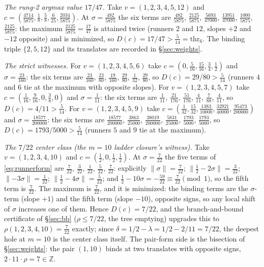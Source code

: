 \documentclass[11pt,a4paper]{article}
\numberwithin{equation}{section}
\theoremstyle{plain}
\theoremstyle{definition}
\theoremstyle{remark}
\newcommand{\Z}{\mathbb{Z}}
\newcommand{\wnc}[1]{\lVert #1 \rVert}
\begin{document}
\emph{The rung-2 argmax value $17/47$.} Take
$v=(1,2,3,4,5,12)$ and
$c=(\tfrac{4714}{5875},\tfrac18,\tfrac58,\tfrac6{25},
\tfrac{2034}{5875})$. At $\sigma=\tfrac{482}{5875}$ the six terms are
$\tfrac{482}{5875}$, $\tfrac{2125}{5875}$, $\tfrac{5693}{47000}$,
$\tfrac{13951}{47000}$, $\tfrac{1000}{5875}$, $\tfrac{2125}{5875}$:
the maximum $\tfrac{2125}{5875}=\tfrac{17}{47}$ is attained twice
(runners $2$ and $12$, slopes $+2$ and $-12$ opposite) and is
minimized, so $D(c)=17/47>\tfrac5{14}=\mathrm{thr}_6$. The binding
triple $\{2,5,12\}$ and its translates are recorded in
\S\ref{sec:weights}.

\emph{The strict witnesses.} For $v=(1,2,3,4,5,6)$ take
$c=(0,\tfrac5{16},\tfrac{15}{16},\tfrac34,\tfrac12)$ and
$\sigma=\tfrac{23}{160}$: the six terms are
$\tfrac{23}{160}$, $\tfrac{23}{80}$, $\tfrac{19}{160}$, $\tfrac{29}{80}$,
$\tfrac1{32}$, $\tfrac{29}{80}$, so $D(c)=29/80>\tfrac5{14}$ (runners
$4$ and $6$ tie at the maximum with opposite slopes). For
$v=(1,2,3,4,5,7)$ take
$c=(\tfrac1{16},\tfrac9{16},0,\tfrac38,0)$ and $\sigma=\tfrac1{11}$:
the six terms are $\tfrac1{11}$, $\tfrac{21}{176}$, $\tfrac{51}{176}$,
$\tfrac4{11}$, $\tfrac7{88}$, $\tfrac4{11}$, so $D(c)=4/11>
\tfrac5{14}$. For $v=(1,2,3,4,5,9)$ take
$c=(\tfrac1{32},\tfrac{15}{32},\tfrac{1383}{10000},
\tfrac{32921}{40000},\tfrac{95473}{200000})$ and
$\sigma=\tfrac{18577}{200000}$: the six terms are
$\tfrac{18577}{200000}$, $\tfrac{3863}{25000}$,
$\tfrac{38019}{200000}$, $\tfrac{5831}{25000}$, $\tfrac{1793}{5000}$,
$\tfrac{1793}{5000}$, so $D(c)=1793/5000>\tfrac5{14}$ (runners $5$ and
$9$ tie at the maximum).

\emph{The $7/22$ center class (the $m=10$ ladder closure's witness).}
Take $v=(1,2,3,4,10)$ and
$c=(\tfrac12,0,\tfrac12,\tfrac12)$. At $\sigma=\tfrac{7}{22}$ the five
terms of \eqref{eq:runnerform} are $\tfrac{7}{22}$, $\tfrac{3}{22}$,
$\tfrac{1}{22}$, $\tfrac{5}{22}$, $\tfrac{7}{22}$: explicitly
$\wnc\sigma=\tfrac7{22}$; $\wnc{\tfrac12-2\sigma}=\tfrac3{22}$;
$\wnc{-3\sigma}=\tfrac1{22}$;
$\wnc{\tfrac12-4\sigma}=\tfrac5{22}$; and
$\tfrac12-10\sigma=-\tfrac{59}{22}\equiv\tfrac7{22}\pmod 1$, so the
fifth term is $\tfrac7{22}$. The maximum is $\tfrac7{22}$, and it is
minimized: the binding terms are the $\sigma$-term (slope $+1$) and the
fifth term (slope $-10$), opposite signs, so any local shift of
$\sigma$ increases one of them. Hence $D(c)=7/22$, and the
branch-and-bound certificate of \S\ref{sec:bb} ($\rho\le7/22$, the
tree emptying) upgrades this to $\rho(1,2,3,4,10)=\tfrac{7}{22}$
exactly; since $\delta=1/2-\lambda=1/2-2/11=7/22$, the deepest hole at
$m=10$ is the center class itself. The pair-form side is the bisection
of \S\ref{sec:weights}: the pair $(1,10)$ binds at two translates with
opposite signs, $2\cdot 11\cdot\rho=7\in\Z$.
\end{document}
